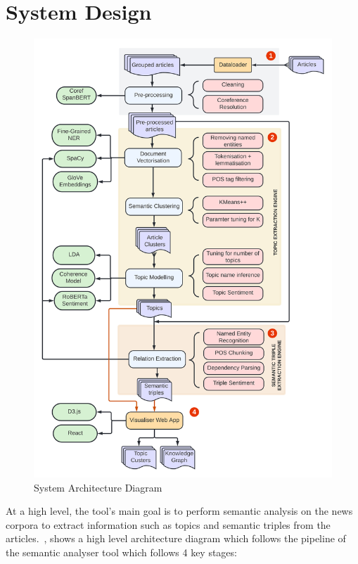 \section{System Design}

\begin{figure}[H]
\centering
\includegraphics[width=0.8\linewidth]{images/system_arch.png}
\caption{System Architecture Diagram}
\label{fig:sys_arch}
\end{figure}
At a high level, the tool's main goal is to perform semantic analysis on the news corpora to extract information such as topics and semantic triples from the articles.~, shows a high level architecture diagram which follows the pipeline of the semantic analyser tool which follows 4 key stages: 


